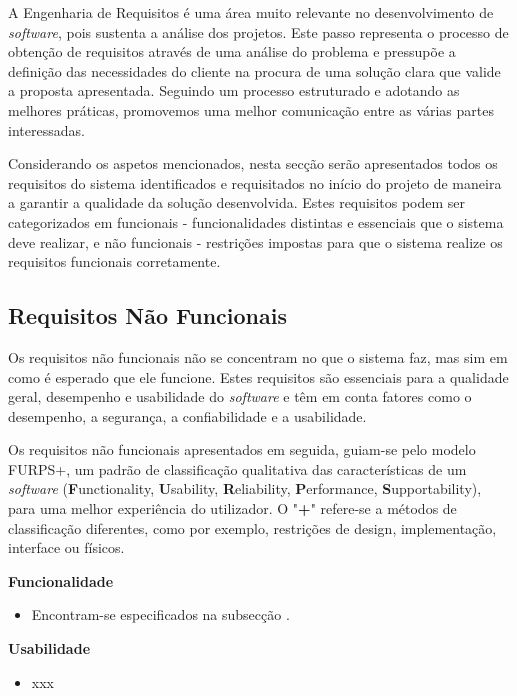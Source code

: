 A Engenharia de Requisitos é uma área muito relevante no desenvolvimento de \textit{software}, pois 
sustenta a análise dos projetos. Este passo representa o processo de obtenção de requisitos através 
de uma análise do problema e pressupõe a definição das necessidades do cliente na procura de uma 
solução clara que valide a proposta apresentada. Seguindo um processo estruturado e adotando as 
melhores práticas, promovemos uma melhor comunicação entre as várias partes interessadas.

Considerando os aspetos mencionados, nesta secção serão apresentados todos os 
requisitos do sistema identificados e requisitados no início do projeto de maneira a garantir a 
qualidade da solução desenvolvida. Estes requisitos podem ser categorizados em funcionais - 
funcionalidades distintas e essenciais que o sistema deve realizar, e não funcionais - 
restrições impostas para que o sistema realize os requisitos funcionais corretamente.

\subsection{Requisitos Não Funcionais}

Os requisitos não funcionais não se concentram no que o sistema faz, mas sim em como é esperado que
ele funcione. Estes requisitos são essenciais para a qualidade geral, desempenho e usabilidade do 
\textit{software} e têm em conta fatores como o desempenho, a segurança, a confiabilidade e a 
usabilidade.

Os requisitos não funcionais apresentados em seguida, guiam-se pelo modelo FURPS+, um padrão de 
classificação qualitativa das características de um \textit{software} (\textbf{F}unctionality, 
\textbf{U}sability, \textbf{R}eliability, \textbf{P}erformance, \textbf{S}upportability), para uma 
melhor experiência do utilizador. O "\textbf{+}" refere-se a métodos de classificação diferentes, 
como por exemplo, restrições de design, implementação, interface ou físicos.

\vspace{5mm}

\textbf{Funcionalidade}
\begin{itemize}
  \item Encontram-se especificados na subsecção .
\end{itemize}

\textbf{Usabilidade}
\begin{itemize}
  \item xxx
\end{itemize}

